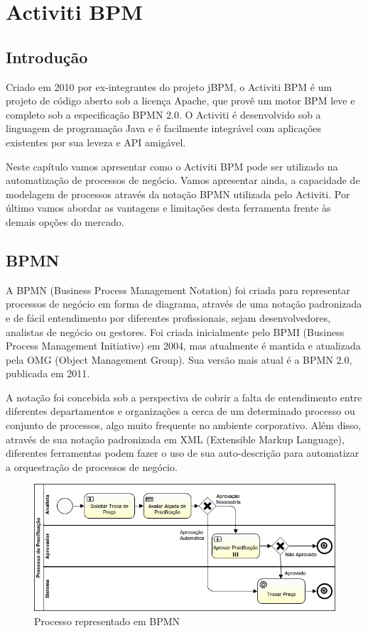 \chapter{Activiti BPM}\label{chp:activiti}

\section{Introdução}\label{sec:activiti-introducao}
Criado em 2010 por ex-integrantes do projeto jBPM, o Activiti BPM é um projeto de código aberto sob a licença Apache, que provê um motor BPM leve e completo sob a especificação BPMN 2.0. O Activiti é desenvolvido sob a linguagem de programação Java e é facilmente integrável com aplicações existentes por sua leveza e API amigável.

Neste capítulo vamos apresentar como o Activiti BPM pode ser utilizado na automatização de processos de negócio. Vamos apresentar ainda, a capacidade de modelagem de processos através da notação BPMN utilizada pelo Activiti. Por último vamos abordar as vantagens e limitações desta ferramenta frente às demais opções do mercado.

\section{BPMN}\label{sec:activiti-bpmn}
A BPMN (Business Process Management Notation) foi criada para representar processos de negócio em forma de diagrama, através de uma notação padronizada e de fácil entendimento por diferentes profissionais, sejam desenvolvedores, analistas de negócio ou gestores. Foi criada inicialmente pelo BPMI (Business Process Management Initiative) em 2004, mas atualmente é mantida e atualizada pela OMG (Object Management Group). Sua versão mais atual é a BPMN 2.0, publicada em 2011.

A notação foi concebida sob a perspectiva de cobrir a falta de entendimento entre diferentes departamentos e organizações a cerca de um determinado processo ou conjunto de processos, algo muito frequente no ambiente corporativo. Além disso, através de sua notação padronizada em XML (Extensible Markup Language), diferentes ferramentas podem fazer o uso de sua auto-descrição para automatizar a orquestração de processos de negócio.

\begin{figure}[H]
  \centering
  \includegraphics[width=1.0\textwidth]{imagens/ProcessoDePrecificacao.png}
  \caption{Processo representado em BPMN}
  \label{fig:exemplo_bpmn}
\end{figure}

